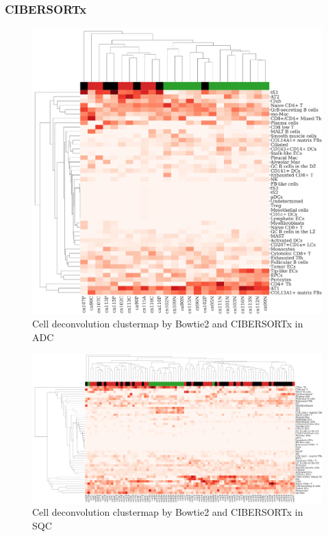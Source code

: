 \documentclass[11pt,a4paper,onecolumn,oneside]{report}
\begin{document}
            \subsubsection{CIBERSORTx}
                \begin{figure}[p]
                    \centering
                    \includegraphics[width=0.6 \linewidth]{figures/CIBERSORTx/clustermap/Bowtie2.ADC.cluster.pdf}
                    \caption{Cell deconvolution clustermap by Bowtie2 and CIBERSORTx in ADC}
                    \label{fig:Deconvolution-CIBERSORTx-Bowtie2-cluster-ADC}
                \end{figure}

                \begin{figure}[p]
                    \centering
                    \includegraphics[width=\linewidth]{figures/CIBERSORTx/clustermap/Bowtie2.SQC.cluster.pdf}
                    \caption{Cell deconvolution clustermap by Bowtie2 and CIBERSORTx in SQC}
                    \label{fig:Deconvolution-CIBERSORTx-Bowtie2-cluster-SQC}
                \end{figure}
\end{document}
